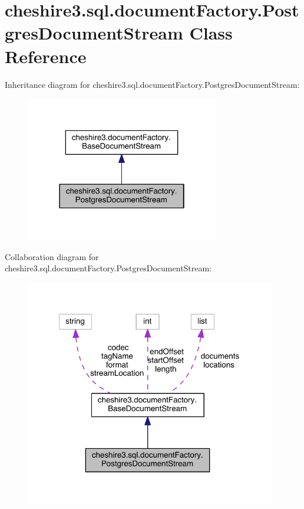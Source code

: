 \hypertarget{classcheshire3_1_1sql_1_1document_factory_1_1_postgres_document_stream}{\section{cheshire3.\-sql.\-document\-Factory.\-Postgres\-Document\-Stream Class Reference}
\label{classcheshire3_1_1sql_1_1document_factory_1_1_postgres_document_stream}
}


Inheritance diagram for cheshire3.\-sql.\-document\-Factory.\-Postgres\-Document\-Stream\-:
\nopagebreak
\begin{figure}[H]
\begin{center}
\leavevmode
\includegraphics[width=238pt]{classcheshire3_1_1sql_1_1document_factory_1_1_postgres_document_stream__inherit__graph}
\end{center}
\end{figure}


Collaboration diagram for cheshire3.\-sql.\-document\-Factory.\-Postgres\-Document\-Stream\-:
\nopagebreak
\begin{figure}[H]
\begin{center}
\leavevmode
\includegraphics[width=309pt]{classcheshire3_1_1sql_1_1document_factory_1_1_postgres_document_stream__coll__graph}
\end{center}
\end{figure}
